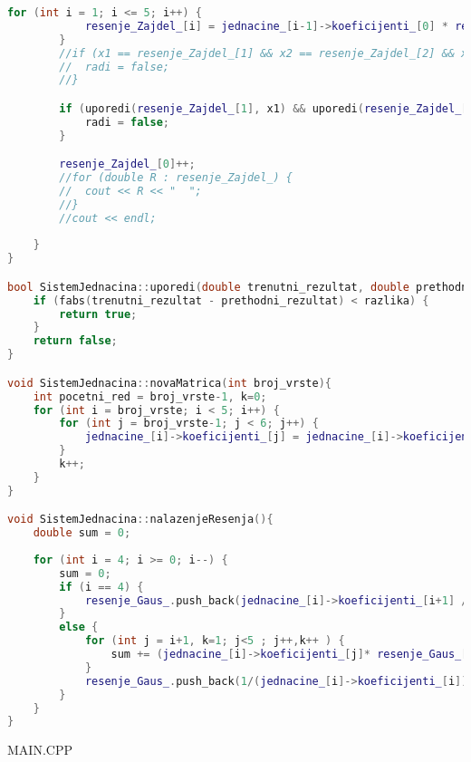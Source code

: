 \documentclass[12pt,leqno,a4paper]{article}
\begin{document}
\begin{lstlisting}[language=C++ ]
		for (int i = 1; i <= 5; i++) {
			resenje_Zajdel_[i] = jednacine_[i-1]->koeficijenti_[0] * resenje_Zajdel_[1] + jednacine_[i - 1]->koeficijenti_[1] * resenje_Zajdel_[2] + jednacine_[i - 1]->koeficijenti_[2] * resenje_Zajdel_[3] + jednacine_[i - 1]->koeficijenti_[3] * resenje_Zajdel_[4] + jednacine_[i - 1]->koeficijenti_[4] * resenje_Zajdel_[5] + jednacine_[i - 1]->koeficijenti_[5];
		}
		//if (x1 == resenje_Zajdel_[1] && x2 == resenje_Zajdel_[2] && x3 == resenje_Zajdel_[3] && x4 == resenje_Zajdel_[4] && x5 == resenje_Zajdel_[5]) {
		//	radi = false;
		//}

		if (uporedi(resenje_Zajdel_[1], x1) && uporedi(resenje_Zajdel_[2], x2) && uporedi(resenje_Zajdel_[3], x3) && uporedi(resenje_Zajdel_[4], x4) && uporedi(resenje_Zajdel_[5], x5)) {
			radi = false;
		}

		resenje_Zajdel_[0]++;
		//for (double R : resenje_Zajdel_) {
		//	cout << R << "  ";
		//}
		//cout << endl;
	
	}
}

bool SistemJednacina::uporedi(double trenutni_rezultat, double prethodni_rezultat, double razlika){
	if (fabs(trenutni_rezultat - prethodni_rezultat) < razlika) {
		return true;
	}
	return false;
}

void SistemJednacina::novaMatrica(int broj_vrste){
	int pocetni_red = broj_vrste-1, k=0;
	for (int i = broj_vrste; i < 5; i++) {
		for (int j = broj_vrste-1; j < 6; j++) {
			jednacine_[i]->koeficijenti_[j] = jednacine_[i]->koeficijenti_[j] - multiplikatori_[k] * jednacine_[pocetni_red]->koeficijenti_[j];
		}
		k++;
	}
}

void SistemJednacina::nalazenjeResenja(){
	double sum = 0;
	
	for (int i = 4; i >= 0; i--) {
		sum = 0;
		if (i == 4) {
			resenje_Gaus_.push_back(jednacine_[i]->koeficijenti_[i+1] / jednacine_[i]->koeficijenti_[i]);
		}
		else {
			for (int j = i+1, k=1; j<5 ; j++,k++ ) {
				sum += (jednacine_[i]->koeficijenti_[j]* resenje_Gaus_[(int)(resenje_Gaus_.size())-k]);
			}
			resenje_Gaus_.push_back(1/(jednacine_[i]->koeficijenti_[i])*(jednacine_[i]->koeficijenti_[5] -sum));
		}
	}
}

\end{lstlisting}
MAIN.CPP
\end{document}
